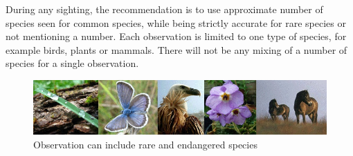During any sighting, the recommendation is to use approximate number of species
seen for common species, while being strictly accurate for rare species or not
mentioning a number. Each observation is limited to one type of species, for
example birds, plants or mammals. There will not be any mixing of a number of species for a single observation.

\begin{figure}[htb]
	\centering
	\includegraphics[width=1\textwidth]{prestudy/field_study/flora_fauna_Nikola.jpg}
	\caption{Observation can include rare and endangered species}
	\label{fig:field_study_species}
\end{figure}


